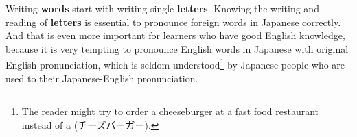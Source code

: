
Writing \textbf{\jtopic{} words} start with writing single \textbf{\jtopic{}
letters}. Knowing the writing and reading of \textbf{\jtopic{} letters} is
essential to pronounce foreign words in Japanese correctly. And that is even
more important for learners who have good English knowledge, because it is very
tempting to pronounce English words in Japanese with original English
pronunciation, which is seldom understood\footnote{The reader might try to
order a cheeseburger at a fast food restaurant instead of a
 (チーズバーガー).} by Japanese people who are used to
their Japanese-English pronunciation.

